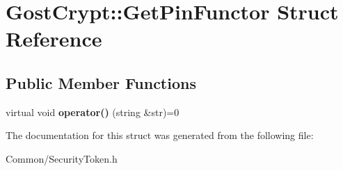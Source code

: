 \hypertarget{struct_gost_crypt_1_1_get_pin_functor}{}\section{Gost\+Crypt\+:\+:Get\+Pin\+Functor Struct Reference}
\label{struct_gost_crypt_1_1_get_pin_functor}
\subsection*{Public Member Functions}
\begin{DoxyCompactItemize}
\item 
\mbox{\label{struct_gost_crypt_1_1_get_pin_functor_a1c0f34a0cb9ef45fe5344730501bb18b}} 
virtual void {\bfseries operator()} (string \&str)=0
\end{DoxyCompactItemize}


The documentation for this struct was generated from the following file\+:\begin{DoxyCompactItemize}
\item 
Common/Security\+Token.\+h\end{DoxyCompactItemize}
